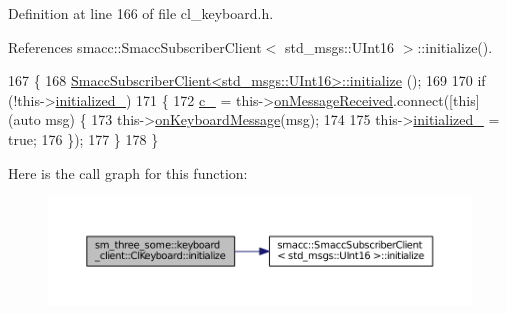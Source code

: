 Definition at line 166 of file cl\+\_\+keyboard.\+h.



References smacc\+::\+Smacc\+Subscriber\+Client$<$ std\+\_\+msgs\+::\+U\+Int16 $>$\+::initialize().


\begin{DoxyCode}
167         \{
168                 \hyperlink{classsmacc_1_1SmaccSubscriberClient_acfa97685ecc588fe61eb57002354b58a}{SmaccSubscriberClient<std\_msgs::UInt16>::initialize}
      ();
169 
170                 \textcolor{keywordflow}{if} (!this->\hyperlink{classsm__three__some_1_1keyboard__client_1_1ClKeyboard_a27fc5aa7027eda6dddd0756448b48172}{initialized\_})
171                 \{
172                         \hyperlink{classsm__three__some_1_1keyboard__client_1_1ClKeyboard_aa55cfcdd60014aed37b8318224e47f9d}{c\_} = this->\hyperlink{classsmacc_1_1SmaccSubscriberClient_a7635fbb013c6fdbc3998da11b44766bb}{onMessageReceived}.connect([\textcolor{keyword}{this}](\textcolor{keyword}{auto} msg) \{
173                                 this->\hyperlink{classsm__three__some_1_1keyboard__client_1_1ClKeyboard_ae5a79e852ff467f4b0c3aa3660ecc4db}{onKeyboardMessage}(msg);
174 
175                                 this->\hyperlink{classsm__three__some_1_1keyboard__client_1_1ClKeyboard_a27fc5aa7027eda6dddd0756448b48172}{initialized\_} = \textcolor{keyword}{true};
176                         \});
177                 \}
178         \}
\end{DoxyCode}


Here is the call graph for this function\+:
\nopagebreak
\begin{figure}[H]
\begin{center}
\leavevmode
\includegraphics[width=350pt]{classsm__three__some_1_1keyboard__client_1_1ClKeyboard_a03947867843ecc8260c184592a34cc72_cgraph}
\end{center}
\end{figure}


